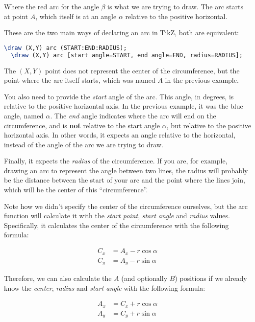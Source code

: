 \documentclass{amsart}
\begin{document}
Where the red arc for the angle $\beta$ is what we are trying to draw. The arc
starts at point $A$, which itself is at an angle $\alpha$ relative to the
positive horizontal.

These are the two main ways of declaring an arc in TikZ, both are equivalent:

\begin{lstlisting}[language=tex]
  \draw (X,Y) arc (START:END:RADIUS);
  \draw (X,Y) arc [start angle=START, end angle=END, radius=RADIUS];
\end{lstlisting}

The $(X,Y)$ point does not represent the center of the circumference, but the
point where the arc itself starts, which was named $A$ in the previous example.

You also need to provide the \textit{start} angle of the arc. This angle, in
degrees, is relative to the positive horizontal axis. In the previous example,
it was the blue angle, named $\alpha$. The \textit{end} angle indicates where
the arc will end on the circumference, and is \textbf{not} relative to the start
angle $\alpha$, but relative to the positive horizontal axis. In other words, it
expects an angle relative to the horizontal, instead of the angle of the arc we
are trying to draw.

Finally, it expects the \textit{radius} of the circumference. If you are, for
example, drawing an arc to represent the angle between two lines, the radius
will probably be the distance between the start of your arc and the point where
the lines join, which will be the center of this ``circumference''.

Note how we didn't specify the center of the circumference ourselves, but the
arc function will calculate it with the \textit{start point}, \textit{start
  angle} and \textit{radius} values. Specifically, it calculates the center of
the circumference with the following formula:

\begin{align*}
C_x &= A_x - r \cos \alpha \\
C_y &= A_y - r \sin \alpha
\end{align*}

Therefore, we can also calculate the $A$ (and optionally $B$) positions if we
already know the \textit{center}, \textit{radius} and \textit{start angle} with
the following formula:

\begin{align*}
A_x &= C_x + r \cos \alpha \\
A_y &= C_y + r \sin \alpha
\end{align*}
\end{document}
